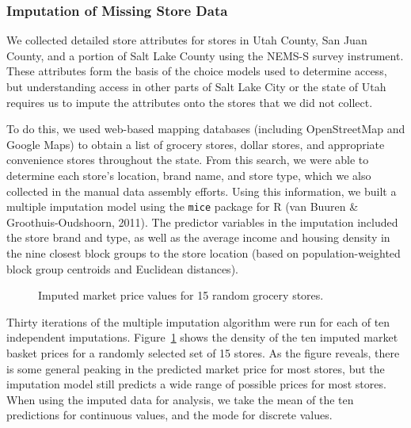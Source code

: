 \documentclass[
  letterpaper,
  number,
  review,
  3p]{elsarticle}
\begin{document}
\subsubsection{Imputation of Missing Store
Data}\label{imputation-of-missing-store-data}

We collected detailed store attributes for stores in Utah County, San
Juan County, and a portion of Salt Lake County using the NEMS-S survey
instrument. These attributes form the basis of the choice models used to
determine access, but understanding access in other parts of Salt Lake
City or the state of Utah requires us to impute the attributes onto the
stores that we did not collect.

To do this, we used web-based mapping databases (including OpenStreetMap
and Google Maps) to obtain a list of grocery stores, dollar stores, and
appropriate convenience stores throughout the state. From this search,
we were able to determine each store's location, brand name, and store
type, which we also collected in the manual data assembly efforts. Using
this information, we built a multiple imputation model using the
\texttt{mice} package for R (van Buuren \& Groothuis-Oudshoorn, 2011).
The predictor variables in the imputation included the store brand and
type, as well as the average income and housing density in the nine
closest block groups to the store location (based on population-weighted
block group centroids and Euclidean distances).

\begin{figure}


\caption{\label{fig-marketimp}Imputed market price values for 15 random
grocery stores.}

\end{figure}%

Thirty iterations of the multiple imputation algorithm were run for each
of ten independent imputations. Figure~\ref{fig-marketimp} shows the
density of the ten imputed market basket prices for a randomly selected
set of 15 stores. As the figure reveals, there is some general peaking
in the predicted market price for most stores, but the imputation model
still predicts a wide range of possible prices for most stores. When
using the imputed data for analysis, we take the mean of the ten
predictions for continuous values, and the mode for discrete values.
\end{document}
